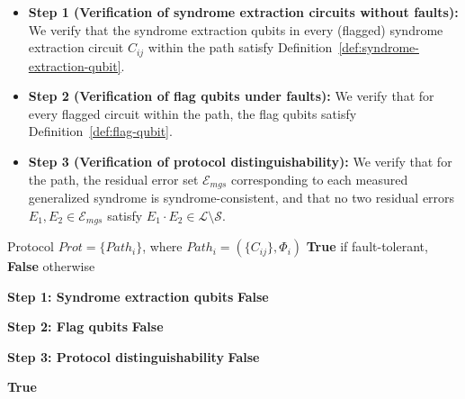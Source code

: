 \documentclass[acmsmallw,review]{acmart}
\begin{document}
\begin{itemize}
    \item \textbf{Step 1 (Verification of syndrome extraction circuits without faults):} We verify that the syndrome extraction qubits in every (flagged) syndrome extraction circuit $C_{ij}$ within the path satisfy Definition~\ref{def:syndrome-extraction-qubit}.
    \item \textbf{Step 2 (Verification of flag qubits under faults):} We verify that for every flagged circuit within the path, the flag qubits satisfy Definition~\ref{def:flag-qubit}. 
    \item \textbf{Step 3 (Verification of protocol distinguishability):} We verify that for the path, the residual error set $\mathcal{E}_{mgs}$ corresponding to each measured generalized syndrome is syndrome-consistent, and that no two residual errors $E_1, E_2 \in \mathcal{E}_{mgs}$ satisfy $E_1 \cdot E_2 \in \mathcal{L} \setminus \mathcal{S}$.
\end{itemize}

\begin{algorithm}[htbp]
\caption{Verification of a Flagged Syndrome Extraction Protocol}
\label{alg:protocol_verification}
\begin{algorithmic}[1]
\Require Protocol $Prot = \{Path_i\}$, where $Path_i = (\{C_{ij}\}, \Phi_i)$
\Ensure \textbf{True} if fault-tolerant, \textbf{False} otherwise

    
    \Statex \textbf{Step 1: Syndrome extraction qubits}
        \State \Return \textbf{False}
    \EndIf

    \Statex \textbf{Step 2: Flag qubits}
        \State \Return \textbf{False}
    \EndIf

    \Statex \textbf{Step 3: Protocol distinguishability}
        \State \Return \textbf{False}
    \EndIf

\EndFor

\Statex
\State \Return \textbf{True}
\end{algorithmic}
\end{algorithm}
\end{document}
